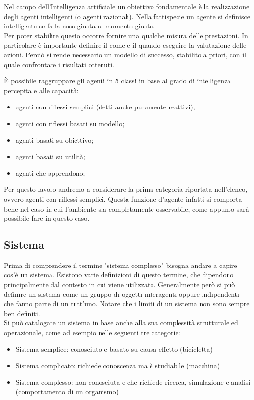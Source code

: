 \documentclass[12pt]{article}
\begin{document}
\noindent Nel campo dell'Intelligenza artificiale un obiettivo fondamentale è la realizzazione degli agenti intelligenti (o agenti razionali). Nella fattispecie un agente si definisce intelligente se fa la cosa giusta al momento giusto.\\

\noindent Per poter stabilire questo occorre fornire una qualche misura delle prestazioni. In particolare è importante definire il come e il quando eseguire la valutazione delle azioni. Perciò si rende necessario un modello di successo, stabilito a priori, con il quale confrontare i risultati ottenuti. \cite{AgenteIntelligente}

\newpage
	
\noindent È possibile raggruppare gli agenti in 5 classi in base al grado di intelligenza percepita e alle capacità: \cite{AgenteIntelligente} \label{Agente}
\begin{itemize}
\item agenti con riflessi semplici (detti anche puramente reattivi);
\item agenti con riflessi basati su modello;
\item agenti basati su obiettivo;
\item agenti basati su utilità;
\item agenti che apprendono;
\end{itemize}

\noindent Per questo lavoro andremo a considerare la prima categoria riportata nell'elenco, ovvero agenti con riflessi semplici. Questa funzione d'agente infatti si comporta bene nel caso in cui l'ambiente sia completamente osservabile, come appunto sarà possibile fare in questo caso.

\subsection{Sistema}
Prima di comprendere il termine "sistema complesso" bisogna andare a capire cos'è un sistema. Esistono varie definizioni di questo termine, che dipendono principalmente dal contesto in cui viene utilizzato. Generalmente però si può definire un sistema come un gruppo di oggetti interagenti oppure indipendenti che fanno parte di un tutt'uno. Notare che i limiti di un sistema non sono sempre ben definiti.\\
Si può catalogare un sistema in base anche alla sua complessità strutturale ed operazionale, come ad esempio nelle seguenti tre categorie:
\begin{itemize}
\item Sistema semplice: conosciuto e basato su causa-effetto (bicicletta)
\item Sistema complicato: richiede conoscenza ma è studiabile (macchina)
\item Sistema complesso: non conosciuta e che richiede ricerca, simulazione e analisi (comportamento di un organismo)
\end{itemize}
\end{document}
